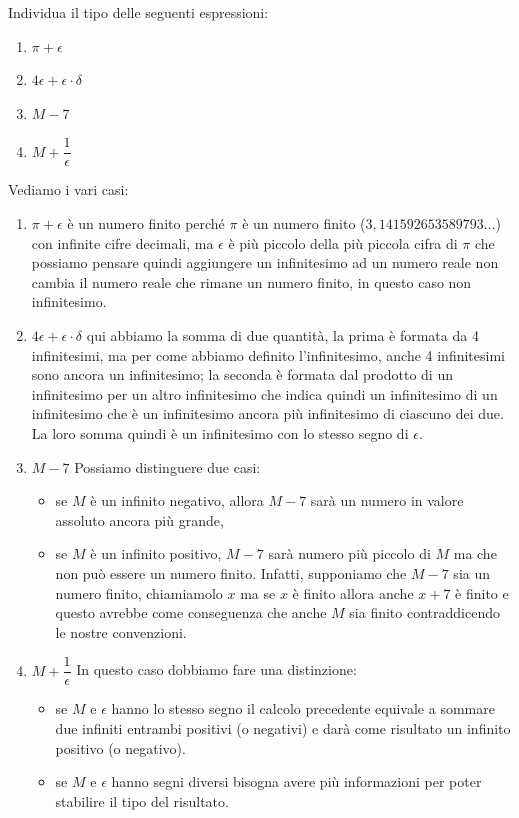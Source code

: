 \begin{esempio}
 Individua il tipo delle seguenti espressioni:

\begin{multicols}{4}
\begin{enumerate}
 \item \(\pi+\epsilon\)
 \item \(4\epsilon+\epsilon \cdot \delta\)
 \item \(M-7\)
 \item \(M+\dfrac{1}{\epsilon}\)
\end{enumerate}
\end{multicols}

Vediamo i vari casi:

\begin{enumerate}
 \item \(\pi+\epsilon\) 
è un numero finito perché \(\pi\) è un numero 
finito (\(3,141592653589793\dots\)) con infinite cifre decimali, ma 
\(\epsilon\) è più piccolo della più piccola cifra di \(\pi\) che possiamo 
pensare quindi aggiungere un infinitesimo ad un numero reale non cambia il 
numero reale che rimane un numero finito, in questo caso non infinitesimo.
 \item  \(4\epsilon+\epsilon \cdot \delta\) 
qui abbiamo la somma di due quantità, 
la prima è formata da 4 infinitesimi, ma per come abbiamo definito 
l'infinitesimo, anche 4 infinitesimi sono ancora un infinitesimo; la 
seconda è formata dal prodotto di un infinitesimo per un altro infinitesimo 
che indica quindi un infinitesimo di un infinitesimo che è un infinitesimo 
ancora più infinitesimo di ciascuno dei due. La loro somma quindi è un 
infinitesimo con lo stesso segno di \(\epsilon\).
 \item \(M-7\)
Possiamo distinguere due casi: 
 \begin{itemize} [noitemsep]
  \item se \(M\) è un infinito negativo, allora 
\(M-7\) sarà un numero in valore assoluto ancora più grande, 
 \item se \(M\) è un infinito positivo, \(M-7\) sarà numero più piccolo di 
\(M\) ma che non può essere un numero finito. 
Infatti, supponiamo che \(M-7\) sia un numero finito, chiamiamolo \(x\) ma 
se \(x\) è finito allora anche \(x+7\) è finito e questo avrebbe come 
conseguenza che anche \(M\) sia finito contraddicendo le nostre convenzioni.
 \end{itemize}
 \item \(M+\dfrac{1}{\epsilon}\)
 In questo caso dobbiamo fare una distinzione:
 \begin{itemize} [noitemsep]
  \item se \(M\) e \(\epsilon\) hanno lo stesso segno il calcolo precedente 
equivale a sommare due infiniti entrambi positivi (o negativi) e darà come 
risultato un infinito positivo (o negativo).
  \item se \(M\) e \(\epsilon\) hanno segni diversi bisogna avere più 
informazioni per poter stabilire il tipo del risultato.
 \end{itemize}


\end{enumerate}
\end{esempio}
